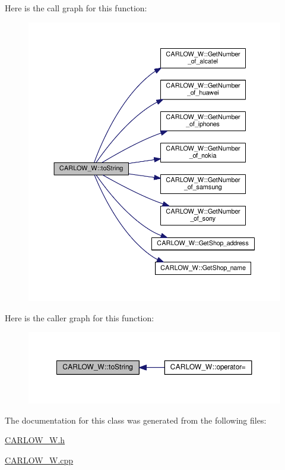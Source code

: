 Here is the call graph for this function\+:\nopagebreak
\begin{figure}[H]
\begin{center}
\leavevmode
\includegraphics[width=350pt]{class_c_a_r_l_o_w___w_a79e683650f861b59752fb027a5f16e5a_cgraph}
\end{center}
\end{figure}




Here is the caller graph for this function\+:\nopagebreak
\begin{figure}[H]
\begin{center}
\leavevmode
\includegraphics[width=350pt]{class_c_a_r_l_o_w___w_a79e683650f861b59752fb027a5f16e5a_icgraph}
\end{center}
\end{figure}




The documentation for this class was generated from the following files\+:\begin{DoxyCompactItemize}
\item 
\hyperlink{_c_a_r_l_o_w___w_8h}{C\+A\+R\+L\+O\+W\+\_\+\+W.\+h}\item 
\hyperlink{_c_a_r_l_o_w___w_8cpp}{C\+A\+R\+L\+O\+W\+\_\+\+W.\+cpp}\end{DoxyCompactItemize}
